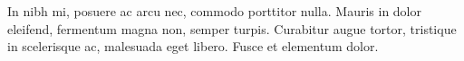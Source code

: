 %
%
%
\par{
    In nibh mi, posuere ac arcu nec, commodo porttitor nulla. Mauris in dolor eleifend, fermentum magna non, semper turpis. Curabitur augue tortor, tristique in scelerisque ac, malesuada eget libero. Fusce et elementum dolor.
}